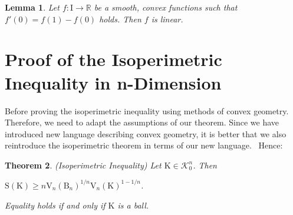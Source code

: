 \documentclass[a4paper]{book}
\newtheorem{theorem}{Theorem}%
\newtheorem{lemma}[theorem]{Lemma}%
\numberwithin{theorem}{section}%
\begin{document}
\begin{lemma}
    Let $f:\mathrm{I}\to\mathbb{R}$ be a smooth, convex functions such that $f'(0)=f(1)-f(0)$ holds. Then $f$ is linear.
\end{lemma}

\section{Proof of the Isoperimetric Inequality in n-Dimension}
Before proving the isoperimetric inequality using methods of convex geometry. Therefore, we need to adapt the assumptions of our theorem. Since we have introduced new language describing convex geometry, it is better that we also reintroduce the isoperimetric theorem in terms of our new language.~\citep{gehring2019isoperimetric} Hence:
\begin{theorem} (Isoperimetric Inequality)
    Let $\mathrm{K}\in\mathscr{K}_{0}^{n}$. Then
    \begin{center}
        $\displaystyle \mathrm{S}(\mathrm{K})\geq n\mathrm{V}_{n}(\mathrm{B}_{n})^{1/n}\mathrm{V}_{n}(\mathrm{K})^{1-1/n}$.
    \end{center}
    Equality holds if and only if $\mathrm{K}$ is a ball.
\end{theorem}
\end{document}
